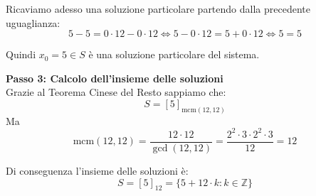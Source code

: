 \documentclass[12pt]{article}
\begin{document}
Ricaviamo adesso una soluzione particolare partendo dalla precedente uguaglianza:
$$5 - 5 = 0 \cdot 12 - 0 \cdot 12 \iff 5 - 0 \cdot 12 = 5 + 0 \cdot 12 \iff 5 = 5$$

Quindi $x_0 = 5 \in S$ è una soluzione particolare del sistema.


\textbf{Passo 3: Calcolo dell'insieme delle soluzioni} \\ 
Grazie al Teorema Cinese del Resto sappiamo che:
$$S = [5]_{\mathrm{mcm}(12, 12)}$$
Ma
$$\mathrm{mcm}({12}, {12}) = \frac{{12} \cdot {12}}{\gcd({12},{12})} = \frac{{2^{2} \cdot 3} \cdot {2^{2} \cdot 3}}{12} = {12}$$

Di conseguenza l'insieme delle soluzioni è:
        $$S = [5]_{12} = \{5 + 12 \cdot k : k \in \mathbb{Z}\}$$
        
\end{document}
